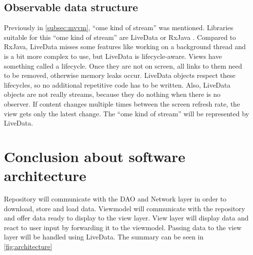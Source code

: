 \subsection{Observable data structure}
\label{subsec:observable}
\newcommand{\somestream}{``ome kind of stream''}
Previously in \autoref{subsec:mvvm}, \somestream{} was mentioned.
Libraries suitable for this \somestream{} are LiveData \cite{livedata} or RxJava \cite{rxjava}.
Compared to RxJava, LiveData misses some features like working on a background thread and is a bit more complex to use, but LiveData is lifecycle-aware.
Views have something called a lifecycle.
Once they are not on screen, all links to them need to be removed, otherwise memory leaks occur.
LiveData objects respect these lifecycles, so no additional repetitive code has to be written.
Also, LiveData objects are not really streams, because they do nothing when there is no observer.
If content changes multiple times between  the  screen  refresh  rate,  the  view  gets  only  the  latest  change.
The \somestream{} will be represented by LiveData.

\section{Conclusion about software architecture}
Repository will communicate with the DAO and Network layer in order to download, store and load data.
Viewmodel will communicate with the repository and offer data ready to display to the view layer.
View layer will display data and react to user input by forwarding it to the viewmodel.
Passing data to the view layer will be handled using LiveData.
The summary can be seen in \autoref{fig:architecture}